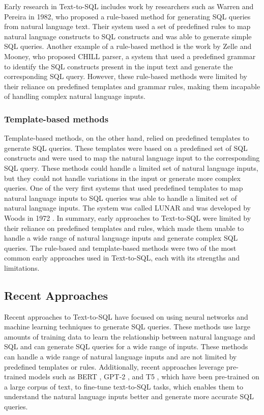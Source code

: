 Early research in Text-to-SQL includes work by researchers such as Warren and Pereira in 1982\cite{Warren1982AnEE}, who proposed a rule-based method for generating SQL queries from natural language text. Their system used a set of predefined rules to map natural language constructs to SQL constructs and was able to generate simple SQL queries. Another example of a rule-based method is the work by Zelle and Mooney, who proposed CHILL parser\cite{Zelle1996LearningTP}, a system that used a predefined grammar to identify the SQL constructs present in the input text and generate the corresponding SQL query. However, these rule-based methods were limited by their reliance on predefined templates and grammar rules, making them incapable of handling complex natural language inputs.

\subsubsection{Template-based methods}

Template-based methods, on the other hand, relied on predefined templates to generate SQL queries. These templates were based on a predefined set of SQL constructs and were used to map the natural language input to the corresponding SQL query. These methods could handle a limited set of natural language inputs, but they could not handle variations in the input or generate more complex queries. One of the very first systems that used predefined templates to map natural language inputs to SQL queries was able to handle a limited set of natural language inputs. The system was called LUNAR and was developed by Woods in 1972 \cite{lunar}.
In summary, early approaches to Text-to-SQL were limited by their reliance on predefined templates and rules, which made them unable to handle a wide range of natural language inputs and generate complex SQL queries. The rule-based and template-based methods were two of the most common early approaches used in Text-to-SQL, each with its strengths and limitations.

\subsection{Recent Approaches}

Recent approaches to Text-to-SQL have focused on using neural networks and machine learning techniques to generate SQL queries. These methods use large amounts of training data to learn the relationship between natural language and SQL and can generate SQL queries for a wide range of inputs. These methods can handle a wide range of natural language inputs and are not limited by predefined templates or rules. Additionally, recent approaches leverage pre-trained models such as BERT \cite{devlin-etal-2019-bert}, GPT-2 \cite{radford2019language}, and T5 \cite{raffel_exploring_2020}, which have been pre-trained on a large corpus of text, to fine-tune text-to-SQL tasks, which enables them to understand the natural language inputs better and generate more accurate SQL queries.

